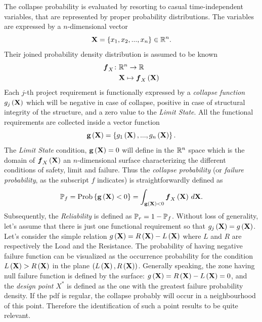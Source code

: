 The collapse probability is evaluated by resorting to casual time-independent variables, that are represented by proper probability distributions. The variables are expressed by a $n$-dimensional vector
\begin{equation*}
\textbf{X} = \cbkt{x_{1}, x_{2},..., x_{n}} \in \R^n.
\end{equation*}
Their joined probability density distribution is assumed to be known
\begin{align*}
\bs{f}_{X}\colon&\R^{n}\rightarrow\R\\
&\mathbf{X}\mapsto\bs{f}_{X}\rbkt{\mathbf{X}}
\end{align*}
Each $j$-th project requirement is functionally expressed by a \textit{collapse function} $g_{j}\rbkt{\mathbf{X}}$ which will be negative in case of collapse, positive in case of structural integrity of the structure, and a zero value to the \textit{Limit State}. All the functional requirements are collected inside a vector function
\begin{equation}
\mathbf{g}\rbkt{\mathbf{X}}=\cbkt{g_{1}\rbkt{\mathbf{X}},...,g_{n}\rbkt{\mathbf{X}}}.
\end{equation}
The \textit{Limit State} condition, $\mathbf{g}\rbkt{\mathbf{X}}=0$ will define in the $\R^{n}$ space which is the domain of $\bs{f}_{X}\rbkt{\mathbf{X}}$ an $n$-dimensional surface characterizing the different conditions of safety, limit and failure. Thus the \textit{collapse probability} (or \textit{failure probability}, as the subscript $f$ indicates) is straightforwardly defined as
\begin{equation}
\P_{f} = \text{Prob}\cbkt{\mathbf{g}\rbkt{\mathbf{X}} < 0}=\int_{\mathbf{g}\rbkt{\mathbf{X}}<0}\bs{f}_{X}\rbkt{\mathbf{X}}\, d \mathbf{X}.
\end{equation}
Subsequently, the \textit{Reliability} is defined as $\P_{r}=1-\P_{f}$. Without loss of generality, let's assume that there is just one functional requirement so that $g_{j}\rbkt{\mathbf{X}}=g\rbkt{\mathbf{X}}$. Let's consider the simple relation $g\rbkt{\mathbf{X}}=R\rbkt{\mathbf{X}}-L\rbkt{\mathbf{X}}$ where $L$ and $R$ are respectively the Load and the Resistance. The probability of having negative failure function can be visualized as the occurrence probability for the condition $L\rbkt{\mathbf{X}}>R\rbkt{\mathbf{X}}$ in the plane $\rbkt{L\rbkt{\mathbf{X}},R\rbkt{\mathbf{X}}}$. Generally speaking, the zone having null failure function is defined by the surface: $g\rbkt{\mathbf{X}}= R\rbkt{\mathbf{X}}-L\rbkt{\mathbf{X}}= 0$, and the \textit{design point} $X^{*}$ is defined as the one with the greatest failure probability density. If the pdf is regular, the collapse probably will occur in a neighbourhood of this point. Therefore the identification of such a point results to be quite relevant.    
